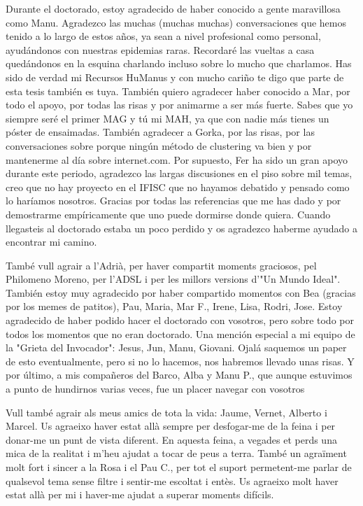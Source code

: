 Durante el doctorado, estoy agradecido de haber conocido a gente maravillosa como Manu. Agradezco las muchas (muchas muchas) conversaciones que hemos tenido a lo largo de estos años, ya sean a nivel profesional como personal, ayudándonos con nuestras epidemias raras. Recordaré las vueltas a casa quedándonos en la esquina charlando incluso sobre lo mucho que charlamos. Has sido de verdad mi Recursos HuManus y con mucho cariño te digo que parte de esta tesis también es tuya. También quiero agradecer haber conocido a Mar, por todo el apoyo, por todas las risas y por animarme a ser más fuerte. Sabes que yo siempre seré el primer MAG y tú mi MAH, ya que con nadie más tienes un póster de ensaimadas. También agradecer a Gorka, por las risas, por las conversaciones sobre porque ningún método de clustering va bien y por mantenerme al día sobre internet.com. Por supuesto, Fer ha sido un gran apoyo durante este periodo, agradezco las largas discusiones en el piso sobre mil temas, creo que no hay proyecto en el IFISC que no hayamos debatido y pensado como lo haríamos nosotros. Gracias por todas las referencias que me has dado y por demostrarme empíricamente que uno puede dormirse donde quiera. Cuando llegasteis al doctorado estaba un poco perdido y os agradezco haberme ayudado a encontrar mi camino.

\pagebreak
També vull agrair a l'Adrià, per haver compartit moments graciosos, pel Philomeno Moreno, per l'ADSL i per les millors versions d'"Un Mundo Ideal". También estoy muy agradecido por haber compartido momentos con Bea (gracias por los memes de patitos), Pau, Maria, Mar F., Irene, Lisa, Rodri, Jose. Estoy agradecido de haber podido hacer el doctorado con vosotros, pero sobre todo por todos los momentos que no eran doctorado. Una mención especial a mi equipo de la "Grieta del Invocador": Jesus, Jun, Manu, Giovani. Ojalá saquemos un paper de esto eventualmente, pero si no lo hacemos, nos habremos llevado unas risas. Y por último, a mis compañeros del Barco, Alba y Manu P., que aunque estuvimos a punto de hundirnos varias veces, fue un placer navegar con vosotros

Vull també agrair als meus amics de tota la vida: Jaume, Vernet, Alberto i Marcel. Us agraeixo haver estat allà sempre per desfogar-me de la feina i per donar-me un punt de vista diferent. En aquesta feina, a vegades et perds una mica de la realitat i m'heu ajudat a tocar de peus a terra. També un agraïment molt fort i sincer a la Rosa i el Pau C., per tot el suport permetent-me parlar de qualsevol tema sense filtre i sentir-me escoltat i entès. Us agraeixo molt haver estat allà per mi i haver-me ajudat a superar moments difícils.


